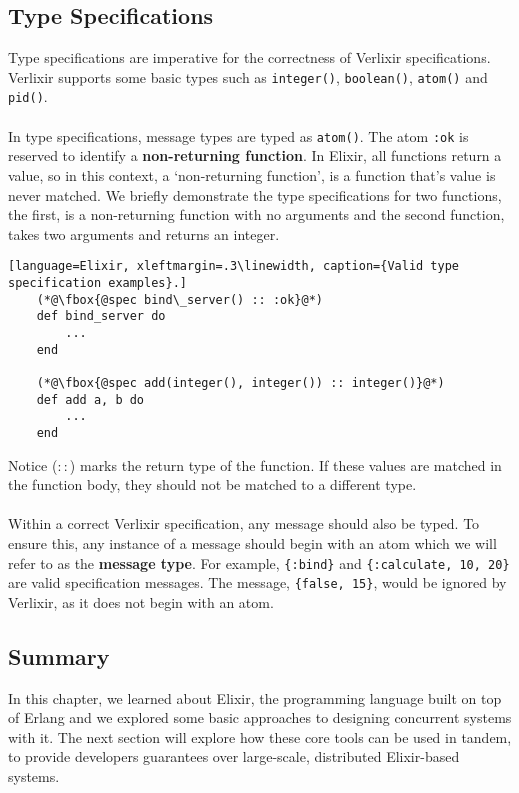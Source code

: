 \subsection{Type Specifications}
Type specifications are imperative for the correctness of Verlixir specifications. Verlixir supports some basic types such as \texttt{integer()}, \texttt{boolean()}, \texttt{atom()} and \texttt{pid()}. 
\\ \\
In type specifications, message types are typed as \texttt{atom()}. The atom \texttt{:ok} is reserved to identify a \textbf{non-returning function}. In Elixir, all functions return a value, so in this context, a `non-returning function', is a function that's value is never matched. We briefly demonstrate the type specifications for two functions, the first, is a non-returning function with no arguments and the second function, takes two arguments and returns an integer.
\begin{lstlisting}[language=Elixir, xleftmargin=.3\linewidth, caption={Valid type specification examples}.]
    (*@\fbox{@spec bind\_server() :: :ok}@*)
    def bind_server do
        ...
    end

    (*@\fbox{@spec add(integer(), integer()) :: integer()}@*)
    def add a, b do
        ...
    end
\end{lstlisting}
Notice ($::$) marks the return type of the function. If these values are matched in the function body, they should not be matched to a different type.
\\ \\
Within a correct Verlixir specification, any message should also be typed. To ensure this, any instance of a message should begin with an atom which we will refer to as the \textbf{message type}. For example, \texttt{\{:bind\}} and \texttt{\{:calculate, 10, 20\}} are valid specification messages. The message, \texttt{\{false, 15\}}, would be ignored by Verlixir, as it does not begin with an atom. 
\subsection{Summary}
In this chapter, we learned about Elixir, the programming language built on top of Erlang and we explored some basic approaches to designing concurrent systems with it. The next section will explore how these core tools can be used in tandem, to provide developers guarantees over large-scale, distributed Elixir-based systems.